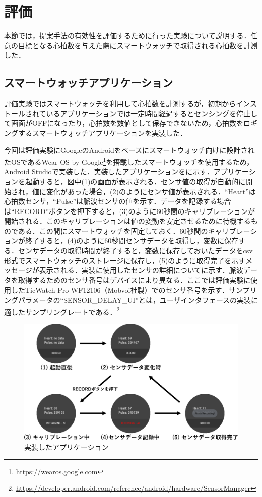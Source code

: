 \documentclass[Japanese,noauthor]{dicomopapers}
\begin{document}
\section{評価}
\label{sec:evaluation}
本節では，提案手法の有効性を評価するために行った実験について説明する．任意の目標となる心拍数を与えた際にスマートウォッチで取得される心拍数を計測した．

\subsection{スマートウォッチアプリケーション}
\label{subsec:app}
評価実験ではスマートウォッチを利用して心拍数を計測するが，初期からインストールされているアプリケーションでは一定時間経過するとセンシングを停止して画面がOFFになったり，心拍数を数値として保存できないため，心拍数をロギングするスマートウォッチアプリケーションを実装した．

今回は評価実験にGoogleのAndroidをベースにスマートウォッチ向けに設計されたOSであるWear OS by Google\footnote{\url{https://wearos.google.com}}を搭載したスマートウォッチを使用するため，Android Studioで実装した．実装したアプリケーションをに示す．アプリケーションを起動すると，図中(1)の画面が表示される．センサ値の取得が自動的に開始され，値に変化があった場合，(2)のようにセンサ値が表示される．``Heart''は心拍数センサ，``Pulse''は脈波センサの値を示す．データを記録する場合は``RECORD''ボタンを押下すると，(3)のように60秒間のキャリブレーションが開始される．このキャリブレーションは値の変動を安定させるために待機するものである．この間にスマートウォッチを固定しておく．60秒間のキャリブレーションが終了すると，(4)のように60秒間センサデータを取得し，変数に保存する．センサデータの取得時間が終了すると，変数に保存しておいたデータをcsv形式でスマートウォッチのストレージに保存し，(5)のように取得完了を示すメッセージが表示される．実装に使用したセンサの詳細についてに示す．脈波データを取得するためのセンサ番号はデバイスにより異なる．ここでは評価実験に使用したTicWatch Pro WF12106（Mobvoi社製）でのセンサ番号を示す．サンプリングパラメータの``SENSOR\_DELAY\_UI''とは，ユーザインタフェースの実装に適したサンプリングレートである．\footnote{\url{https://developer.android.com/reference/android/hardware/SensorManager}}

\begin{figure}[!t]
  \centering
  \includegraphics[width=1\linewidth]{figures/app.eps}
  \caption{実装したアプリケーション}
  \label{fig:app}
\end{figure}
\end{document}
